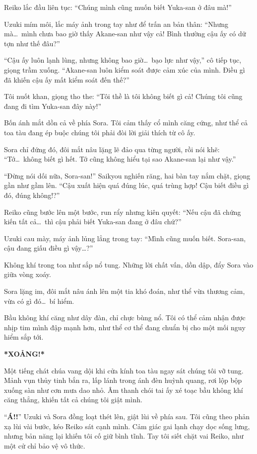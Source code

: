 \documentclass[../main.tex]{subfiles}
\begin{document}
Reiko lắc đầu liên tục: ``Chúng mình cũng muốn biết Yuka-san ở đâu mà!''

Uzuki mím môi, lắc máy ảnh trong tay như để trấn an bản thân: ``Nhưng mà\dots\ mình chưa bao giờ thấy Akane-san như vậy cả! Bình thường cậu ấy có dữ tợn như thế đâu?''

``Cậu ấy luôn lạnh lùng, nhưng không bao giờ\dots\ bạo lực như vậy,'' cô tiếp tục, giọng trầm xuống. ``Akane-san luôn kiểm soát được cảm xúc của mình. Điều gì đã khiến cậu ấy mất kiểm soát đến thế?''

Tôi nuốt khan, giọng tho the: ``Tôi thề là tôi không biết gì cả! Chúng tôi cũng đang đi tìm Yuka-san đây này!''

Bốn ánh mắt dồn cả về phía Sora. Tôi cảm thấy cổ mình căng cứng, như thể cả toa tàu đang ép buộc chúng tôi phải đòi lời giải thích từ cô ấy.

Sora chỉ đứng đó, đôi mắt nâu lặng lẽ đảo qua từng người, rồi nói khẽ: ``Tớ\dots\ không biết gì hết. Tớ cũng không hiểu tại sao Akane-san lại như vậy.''

``Đừng nói dối nữa, Sora-san!'' Saikyou nghiến răng, hai bàn tay nắm chặt, giọng gần như gầm lên. ``Cậu xuất hiện quá đúng lúc, quá trùng hợp! Cậu biết điều gì đó, đúng không!?''

Reiko cũng bước lên một bước, run rẩy nhưng kiên quyết: ``Nếu cậu đã chứng kiến tất cả\dots\ thì cậu phải biết Yuka-san đang ở đâu chứ?''

Uzuki cau mày, máy ảnh lủng lẳng trong tay: ``Mình cũng muốn biết. Sora-san, cậu đang giấu điều gì vậy\dots?''

Không khí trong toa như sắp nổ tung. Những lời chất vấn, dồn dập, đẩy Sora vào giữa vòng xoáy.

Sora lặng im, đôi mắt nâu ánh lên một tia khó đoán, như thể vừa thương cảm, vừa có gì đó\dots\ bí hiểm.

Bầu không khí căng như dây đàn, chỉ chực bùng nổ. Tôi có thể cảm nhận được nhịp tim mình đập mạnh hơn, như thể cơ thể đang chuẩn bị cho một mối nguy hiểm sắp tới.

\textbf{*XOẢNG!*}

Một tiếng chát chúa vang dội khi cửa kính toa tàu ngay sát chúng tôi vỡ tung. Mảnh vụn thủy tinh bắn ra, lấp lánh trong ánh đèn huỳnh quang, rơi lộp bộp xuống sàn như cơn mưa dao nhỏ. Âm thanh chói tai ấy xé toạc bầu không khí căng thẳng, khiến tất cả chúng tôi giật mình.


``\textbf{Á!!}'' Uzuki và Sora đồng loạt thét lên, giật lùi về phía sau. Tôi cũng theo phản xạ lùi vài bước, kéo Reiko sát cạnh mình. Cảm giác gai lạnh chạy dọc sống lưng, nhưng bản năng lại khiến tôi cố giữ bình tĩnh. Tay tôi siết chặt vai Reiko, như một cử chỉ bảo vệ vô thức.
\end{document}
